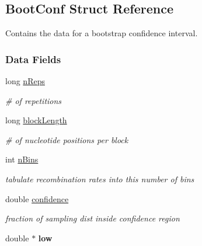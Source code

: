 \hypertarget{struct_boot_conf}{\subsection{\-Boot\-Conf \-Struct \-Reference}
\label{struct_boot_conf}
}


\-Contains the data for a bootstrap confidence interval.  


\subsubsection*{\-Data \-Fields}
\begin{DoxyCompactItemize}
\item 
\hypertarget{struct_boot_conf_ad7d61e383dfef5ae24ec8dea59feda3d}{long \hyperlink{struct_boot_conf_ad7d61e383dfef5ae24ec8dea59feda3d}{n\-Reps}}\label{struct_boot_conf_ad7d61e383dfef5ae24ec8dea59feda3d}

\begin{DoxyCompactList}\small\item\em \# of repetitions \end{DoxyCompactList}\item 
\hypertarget{struct_boot_conf_abd095b45e3b74b9da1abad14d9abf501}{long \hyperlink{struct_boot_conf_abd095b45e3b74b9da1abad14d9abf501}{block\-Length}}\label{struct_boot_conf_abd095b45e3b74b9da1abad14d9abf501}

\begin{DoxyCompactList}\small\item\em \# of nucleotide positions per block \end{DoxyCompactList}\item 
\hypertarget{struct_boot_conf_a3d42d32697c1d9f7371b4fdc75c7ab7a}{int \hyperlink{struct_boot_conf_a3d42d32697c1d9f7371b4fdc75c7ab7a}{n\-Bins}}\label{struct_boot_conf_a3d42d32697c1d9f7371b4fdc75c7ab7a}

\begin{DoxyCompactList}\small\item\em tabulate recombination rates into this number of bins \end{DoxyCompactList}\item 
\hypertarget{struct_boot_conf_a755fb4fbfa8e079445e1c6a8298446f9}{double \hyperlink{struct_boot_conf_a755fb4fbfa8e079445e1c6a8298446f9}{confidence}}\label{struct_boot_conf_a755fb4fbfa8e079445e1c6a8298446f9}

\begin{DoxyCompactList}\small\item\em fraction of sampling dist inside confidence region \end{DoxyCompactList}\item 
\hypertarget{struct_boot_conf_aed2ad2c316f488f9d44879571db8cd43}{double $\ast$ {\bfseries low}}\label{struct_boot_conf_aed2ad2c316f488f9d44879571db8cd43}


\end{DoxyCompactItemize}

